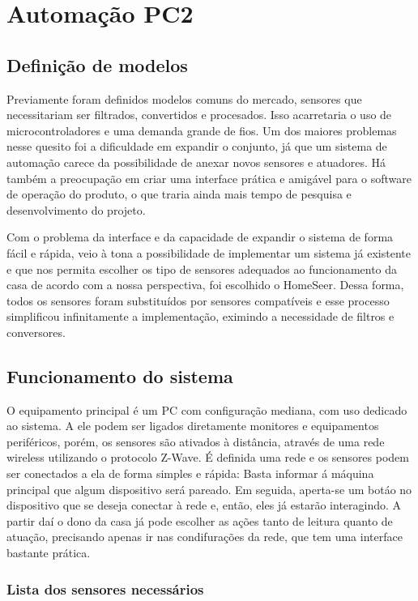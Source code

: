 \chapter{Automação PC2}
\section{Definição de modelos}

	Previamente foram definidos modelos comuns do mercado, sensores que necessitariam ser filtrados, convertidos e procesados. Isso acarretaria o uso de microcontroladores e uma demanda grande de fios. Um dos maiores problemas nesse quesito foi a dificuldade em expandir o conjunto, já que um sistema de automação carece da possibilidade de anexar novos sensores e atuadores. Há também a preocupação em criar uma interface prática e amigável para o software de operação do produto, o que traria ainda mais tempo de pesquisa e desenvolvimento do projeto.  

	Com o problema da interface e da capacidade de expandir o sistema de forma fácil e rápida, veio à tona a possibilidade de implementar um sistema já existente e que nos permita escolher os tipo de sensores adequados ao funcionamento da casa de acordo com a nossa perspectiva, foi escolhido o HomeSeer. Dessa forma, todos os sensores foram substituídos por sensores compatíveis e esse processo simplificou infinitamente a implementação, eximindo a necessidade de filtros e conversores. 

\section{Funcionamento do sistema}

	O equipamento principal é um PC com configuração mediana, com uso dedicado ao sistema. A ele podem ser ligados diretamente monitores e equipamentos periféricos, porém, os sensores são ativados à distância, através de uma rede wireless utilizando o protocolo Z-Wave. É definida uma rede e os sensores podem ser conectados a ela de forma simples e rápida: Basta informar á máquina principal que algum dispositivo será pareado. Em seguida, aperta-se um botáo no dispositivo que se deseja conectar à rede e, então, eles já estarão interagindo.  A partir daí o dono da casa já pode escolher as ações tanto de leitura quanto de atuação, precisando apenas ir nas condifurações da rede, que tem uma interface bastante prática.

\subsection{Lista dos sensores necessários}

